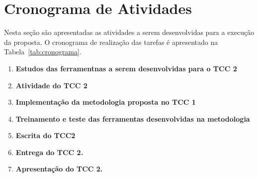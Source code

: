



\chapter{Cronograma de Atividades}
\label{cap:proposta:sec:cronograma}



Nesta seção são apresentadas as atividades a serem desenvolvidas para a execução da proposta. O cronograma de realização das tarefas é apresentado na Tabela~\ref{tab:cronograma}.

\begin{enumerate}
\item \textbf{Estudos das ferramentnas a serem desenvolvidas para o TCC 2}
\item \textbf{Atividade do TCC 2}
\item \textbf{Implementação da metodologia proposta no TCC 1}
\item \textbf{Treinamento e teste das ferramentas desenvolvidas na metodologia}
\item \textbf{Escrita do TCC2}
\item \textbf{Entrega do TCC 2.}
\item \textbf{Apresentação do TCC 2.}
\end{enumerate}

